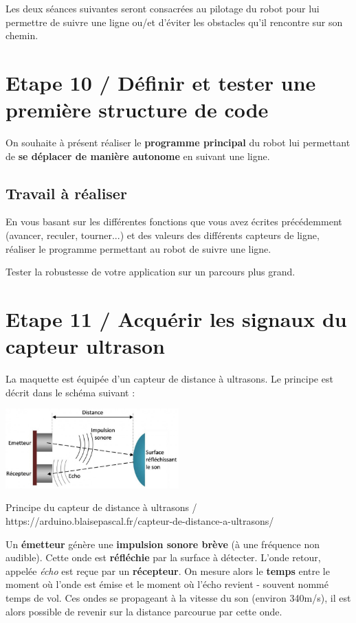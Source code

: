 \documentclass[a4paper,11pt,titlepage]{article} %
\begin{document}
Les deux séances suivantes seront consacrées au pilotage du robot pour lui permettre de suivre une ligne ou/et d'éviter les obstacles qu'il rencontre sur son chemin.

\section{Etape 10 / Définir et tester une première structure de code}

On souhaite à présent réaliser le \textbf{programme principal} du robot lui permettant de \textbf{se déplacer de manière autonome} en suivant une ligne.


\subsection{Travail à réaliser}

\Manip En vous basant sur les différentes fonctions que vous avez écrites précédemment (avancer, reculer, tourner...) et des valeurs des différents capteurs de ligne, réaliser le programme permettant au robot de suivre une ligne.

\Manip Tester la robustesse de votre application sur un parcours plus grand.

\section{Etape 11 / Acquérir les signaux du capteur ultrason}

La maquette est équipée d'un capteur de distance à ultrasons. Le principe est décrit dans le schéma suivant :

\begin{center}
	\includegraphics[width=0.5\textwidth]{images/Principe_Ultrasons_1_arduino.blaisepascal.fr.jpg}
	
	Principe du capteur de distance à ultrasons / https://arduino.blaisepascal.fr/capteur-de-distance-a-ultrasons/
\end{center}

Un \textbf{émetteur} génère une \textbf{impulsion sonore brève} (à une fréquence non audible). Cette onde est \textbf{réfléchie} par la surface à détecter. L'onde retour, appelée \textsl{écho} est reçue par un \textbf{récepteur}. On mesure alors le \textbf{temps} entre le moment où l'onde est émise et le moment où l'écho revient - souvent nommé temps de vol. Ces ondes se propageant à la vitesse du son (environ 340m/s), il est alors possible de revenir sur la distance parcourue par cette onde.
\end{document}
